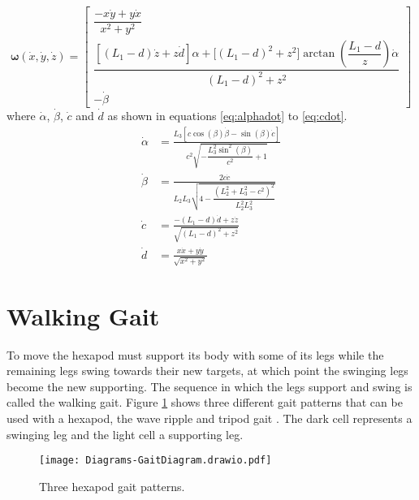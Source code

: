             \begin{equation}\label{eq:rate}
                \bm{\omega}(\dot{x}, \dot{y}, \dot{z}) =
                                    \begin{bmatrix}
                                        \dfrac{- x\dot{y} + y \dot{x}}{x^2 + y^2}\\[0.5cm]
                                        \dfrac{\left[(L_1 - d)\dot{z} + z\dot{d}\right]\alpha + \Big[(L_1 - d)^2 + z^2\Big]\arctan{\left(\dfrac{L_1-d}{z}\right)}\dot{\alpha}}{(L_1 - d)^2 + z^2}\\[0.8cm]
                                        -\dot{\beta} 
                                    \end{bmatrix}
            \end{equation}
            where \(\dot\alpha\), \(\dot\beta\), \(\dot{c}\) and \(\dot{d}\) as shown in equations \ref{eq:alphadot} to \ref{eq:cdot}.
            \begin{align}
                \dot{\alpha} &= \frac{ L_3\left[ c\cos(\beta)\dot{\beta} - \sin(\beta)\dot{c} \right] }{ c^2\sqrt{-\dfrac{L_3^2\sin^2(\beta)}{c^2}+1} } \label{eq:alphadot} \\[0.5cm] 
                \dot{\beta} &= \frac{ 2c\dot{c} }{ L_2L_3\sqrt{4 - \dfrac{(L_2^2+L_3^2-c^2)^2}{L_2^2L_3^2}} } \label{eq:betadot} \\[0.5cm]
                \dot{c} &= \frac{-(L_1 - d)\dot{d} + z\dot{z}}{\sqrt{(L_1 - d)^2 + z^2}} \label{eq:bdot} \\[0.5cm]
                \dot{d} &= \frac{x\dot{x} + y\dot{y}}{\sqrt{x^2 + y^2}} \label{eq:cdot}
            \end{align}
    
    \newpage
    \section{Walking Gait}
        To move the hexapod must support its body with some of its legs while the remaining legs swing towards their new targets,
        at which point the swinging legs become the new supporting. The sequence in which the legs support and swing is called the walking gait.
        Figure \ref{fig:gait_patterns} shows three different gait patterns that can be used with a hexapod, the wave ripple and tripod gait \citep{Darbha2017AnOS}.
        The dark cell represents a swinging leg and the light cell a supporting leg.
        \begin{figure}[h]
            \centering
            \texttt{[image: Diagrams-GaitDiagram.drawio.pdf]}
            \caption{Three hexapod gait patterns.}
            \label{fig:gait_patterns}
        \end{figure}

